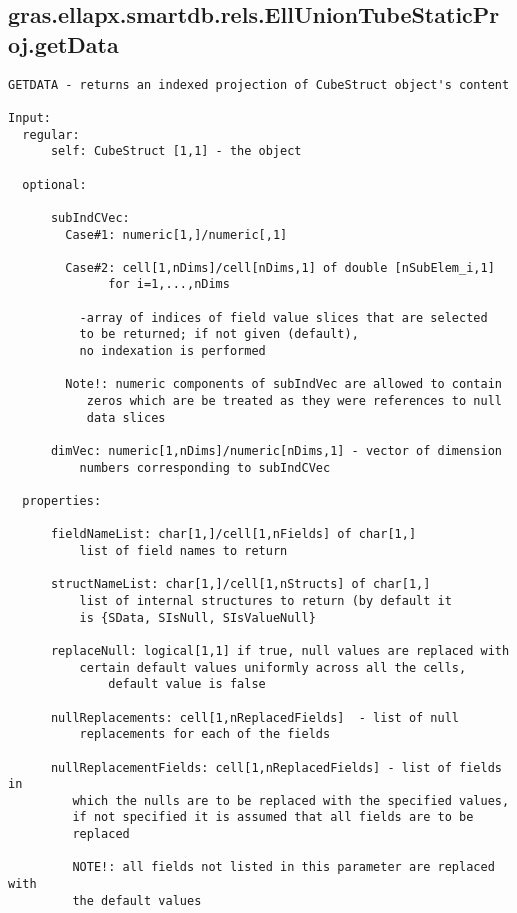 \subsection{\texorpdfstring{gras.ellapx.smartdb.rels.EllUnionTubeStaticProj.getData}{getData}}\label{method:gras.ellapx.smartdb.rels.EllUnionTubeStaticProj.getData}
\begin{verbatim}
GETDATA - returns an indexed projection of CubeStruct object's content

Input:
  regular:
      self: CubeStruct [1,1] - the object

  optional:

      subIndCVec:
        Case#1: numeric[1,]/numeric[,1]

        Case#2: cell[1,nDims]/cell[nDims,1] of double [nSubElem_i,1]
              for i=1,...,nDims

          -array of indices of field value slices that are selected
          to be returned; if not given (default),
          no indexation is performed

        Note!: numeric components of subIndVec are allowed to contain
           zeros which are be treated as they were references to null
           data slices

      dimVec: numeric[1,nDims]/numeric[nDims,1] - vector of dimension
          numbers corresponding to subIndCVec

  properties:

      fieldNameList: char[1,]/cell[1,nFields] of char[1,]
          list of field names to return

      structNameList: char[1,]/cell[1,nStructs] of char[1,]
          list of internal structures to return (by default it
          is {SData, SIsNull, SIsValueNull}

      replaceNull: logical[1,1] if true, null values are replaced with
          certain default values uniformly across all the cells,
              default value is false

      nullReplacements: cell[1,nReplacedFields]  - list of null
          replacements for each of the fields

      nullReplacementFields: cell[1,nReplacedFields] - list of fields in
         which the nulls are to be replaced with the specified values,
         if not specified it is assumed that all fields are to be
         replaced

         NOTE!: all fields not listed in this parameter are replaced with
         the default values


\end{verbatim}
